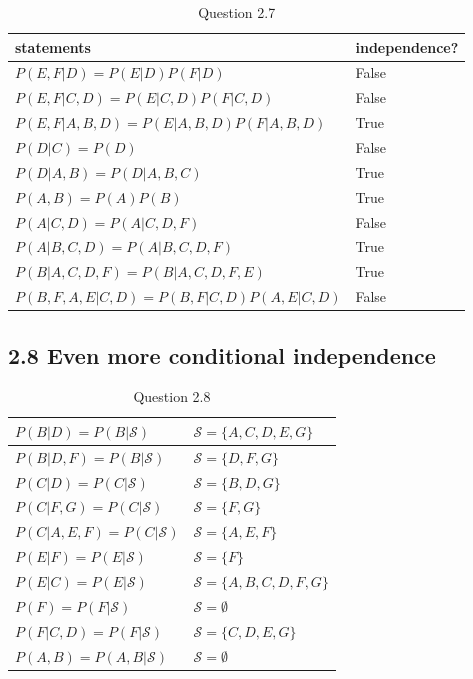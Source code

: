 \documentclass{article}
\begin{document}
\begin{table}[h!]
	\centering
	\begin{tabular}{|p{8cm}|p{2cm}|}
		\hline
		statements & independence?\\
		\hline
		$P(E,F|D) = P(E|D)P(F|D) $ & False \\
		\hline
		$P(E,F|C,D) = P(E|C,D)P(F|C,D) $ & False \\
		\hline
		$P(E,F|A,B,D) = P(E|A,B,D)P(F|A,B,D) $ & True \\
		\hline
		$P(D|C) = P(D)$ & False \\
		\hline
		$P(D|A,B) = P(D|A,B,C)$ & True \\
		\hline
		$ P(A,B) = P(A)P(B) $ & True \\
		\hline
		$P(A|C,D) = P(A|C,D,F)$ & False \\
		\hline
		$P(A|B,C,D) = P(A|B,C,D,F)$ & True \\
		\hline
		$P(B|A,C,D,F) = P(B|A,C,D,F,E)$ & True \\
		\hline
		$P(B,F,A,E|C,D) = P(B,F|C,D)P(A,E|C,D)$ & False \\
		\hline
	\end{tabular}
	\caption{Question 2.7}
\end{table}

\subsection*{2.8 Even more conditional independence}

\begin{table}[h!]
	\centering
	\begin{tabular}{|p{6cm}|p{4cm}|}
		\hline
		$P(B|D) = P(B|\mathcal{S})$ & $\mathcal{S}=\{A,C,D,E,G\}$\\
		\hline
		$ P(B|D,F) = P(B|\mathcal{S})$ & $\mathcal{S}=\{D,F,G\}$ \\
		\hline
		$ P(C|D) = P(C|\mathcal{S})$ & $\mathcal{S}=\{B,D,G\}$ \\
		\hline
		$ P(C|F,G) = P(C|\mathcal{S}) $ & $\mathcal{S}=\{F,G\}$\\
		\hline
		$P(C|A,E,F) = P(C|\mathcal{S})$ & $\mathcal{S}=\{A,E,F\}$\\
		\hline
		$ P(E|F) = P(E|\mathcal{S}) $ & $\mathcal{S}=\{F\}$\\
		\hline
		$P(E|C) = P(E|\mathcal{S}) $ & $\mathcal{S}=\{A,B,C,D,F,G\}$\\
		\hline
		$P(F) = P(F|\mathcal{S})$ & $\mathcal{S}=\emptyset$\\
		\hline
		$ P(F|C,D) = P(F|\mathcal{S})$ & $\mathcal{S}=\{C,D,E,G\}$\\
		\hline
        $ P(A,B) = P(A,B|\mathcal{S}) $ & $\mathcal{S}=\emptyset$\\
        \hline
	\end{tabular}
	\caption{Question 2.8}
\end{table}
\end{document}
